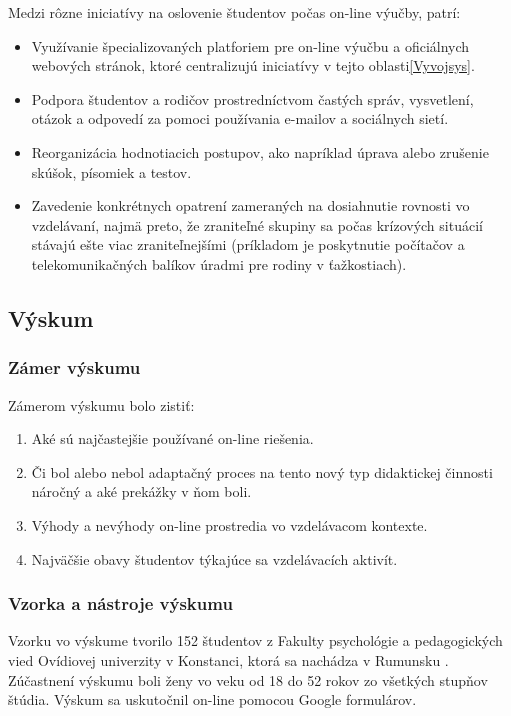 \documentclass[10pt,oneside,slovak,a4paper]{article}
\begin{document}
Medzi rôzne iniciatívy na oslovenie študentov počas on-line výučby, patrí:  %
\begin{itemize}
	\item Využívanie špecializovaných platforiem pre on-line výučbu a oficiálnych webových stránok, ktoré centralizujú iniciatívy v tejto oblasti\ref{Vyvojsys}.%
	\item Podpora študentov a rodičov prostredníctvom častých správ, vysvetlení, otázok a odpovedí za pomoci používania e-mailov a sociálnych sietí.
	\item Reorganizácia hodnotiacich postupov, ako napríklad úprava alebo zrušenie skúšok, písomiek a testov.
	\item Zavedenie konkrétnych opatrení zameraných na dosiahnutie rovnosti vo vzdelávaní, najmä preto, že zraniteľné skupiny sa počas krízových situácií stávajú ešte viac zraniteľnejšími (príkladom je poskytnutie počítačov a telekomunikačných balíkov úradmi pre rodiny v ťažkostiach).
\end{itemize}

\subsection{Výskum}%
\subsubsection{Zámer výskumu}
Zámerom výskumu bolo zistiť\cite{covid19}:
\begin{enumerate}
	\item Aké sú najčastejšie používané on-line riešenia.
	\item Či bol alebo nebol adaptačný proces na tento nový typ didaktickej činnosti náročný a aké prekážky v ňom boli.
	\item Výhody a nevýhody on-line prostredia vo vzdelávacom kontexte.
	\item Najväčšie obavy študentov týkajúce sa vzdelávacích aktivít. %
\end{enumerate}
\subsubsection{Vzorka a nástroje výskumu}
Vzorku vo výskume tvorilo 152 študentov z Fakulty psychológie a pedagogických vied Ovídiovej univerzity v Konstanci, ktorá sa nachádza v Rumunsku \cite{covid19}.
Zúčastnení výskumu boli ženy vo veku od 18 do 52 rokov zo všetkých stupňov štúdia.
Výskum sa uskutočnil on-line pomocou Google formulárov. %
\end{document}
